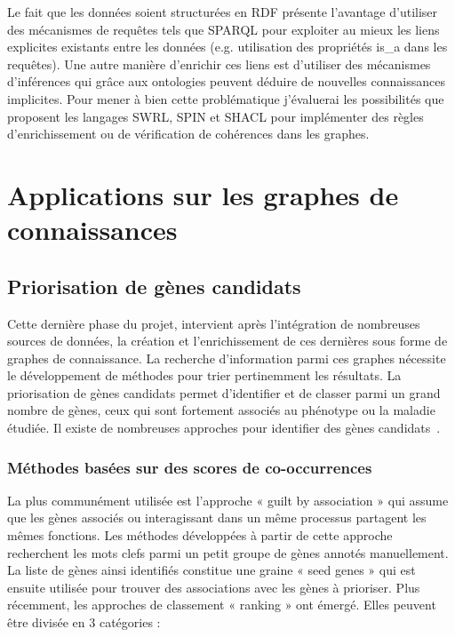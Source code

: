Le fait que les données soient structurées en RDF présente l'avantage d'utiliser des mécanismes de requêtes tels que SPARQL pour exploiter au mieux les liens explicites existants entre les données (e.g. utilisation des propriétés is\_a dans les requêtes). Une autre manière d’enrichir ces liens est d’utiliser des mécanismes d’inférences qui grâce aux ontologies peuvent déduire de nouvelles connaissances implicites. Pour mener à bien cette problématique j’évaluerai les possibilités que proposent les langages SWRL, SPIN et SHACL  pour implémenter des règles d’enrichissement ou de vérification de cohérences dans les graphes.

\section{Applications sur les graphes de connaissances}
\subsection{Priorisation de gènes candidats}


Cette dernière phase du projet, intervient après l’intégration de nombreuses sources de données, la création et l’enrichissement de ces dernières sous forme de graphes de connaissance. La recherche d’information parmi ces graphes nécessite le développement de méthodes pour trier pertinemment les résultats.  La priorisation de gènes candidats permet d’identifier et de classer parmi un grand nombre de gènes, ceux qui sont fortement associés au phénotype ou la maladie étudiée. Il existe de nombreuses approches pour identifier des gènes candidats~\cite{Moreau2012}. \\

\subsubsection*{Méthodes basées sur des scores de co-occurrences}
La plus communément utilisée est l’approche « guilt by association » qui assume que les gènes associés ou interagissant dans un même processus partagent les mêmes fonctions. Les méthodes développées à partir de cette approche recherchent les mots clefs parmi un petit groupe de gènes annotés manuellement. La liste de gènes ainsi identifiés constitue une graine « seed genes » qui est ensuite utilisée pour trouver des associations avec les gènes à prioriser. 
Plus récemment, les approches de classement « ranking » ont émergé. Elles peuvent être divisée en 3 catégories : \\


